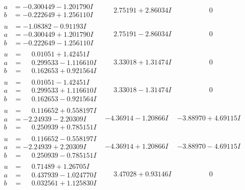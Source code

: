 \documentclass[1p]{elsarticle_modified}
\theoremstyle{definition}
\begin{document}
$$\begin{array}{c|c|c}
\begin{aligned}
a &= -0.300449 - 1.201790 I \\
b &= -0.222649 + 1.256110 I\end{aligned}
 & \phantom{-}2.75191 + 2.86034 I & \phantom{-0.000000 } 0 \\ \hline\begin{aligned}
u &= -1.08382 - 0.91193 I \\
a &= -0.300449 + 1.201790 I \\
b &= -0.222649 - 1.256110 I\end{aligned}
 & \phantom{-}2.75191 - 2.86034 I & \phantom{-0.000000 } 0 \\ \hline\begin{aligned}
u &= \phantom{-}0.01051 + 1.42451 I \\
a &= \phantom{-}0.299533 - 1.116610 I \\
b &= \phantom{-}0.162653 + 0.921564 I\end{aligned}
 & \phantom{-}3.33018 + 1.31474 I & \phantom{-0.000000 } 0 \\ \hline\begin{aligned}
u &= \phantom{-}0.01051 - 1.42451 I \\
a &= \phantom{-}0.299533 + 1.116610 I \\
b &= \phantom{-}0.162653 - 0.921564 I\end{aligned}
 & \phantom{-}3.33018 - 1.31474 I & \phantom{-0.000000 } 0 \\ \hline\begin{aligned}
u &= \phantom{-}0.116652 + 0.558197 I \\
a &= -2.24939 - 2.20309 I \\
b &= \phantom{-}0.250939 + 0.785151 I\end{aligned}
 & -4.36914 - 1.20866 I & -3.88970 + 4.69115 I \\ \hline\begin{aligned}
u &= \phantom{-}0.116652 - 0.558197 I \\
a &= -2.24939 + 2.20309 I \\
b &= \phantom{-}0.250939 - 0.785151 I\end{aligned}
 & -4.36914 + 1.20866 I & -3.88970 - 4.69115 I \\ \hline\begin{aligned}
u &= \phantom{-}0.71489 + 1.26705 I \\
a &= \phantom{-}0.437939 - 1.024770 I \\
b &= \phantom{-}0.032561 + 1.125830 I\end{aligned}
 & \phantom{-}3.47028 + 0.93146 I & \phantom{-0.000000 } 0 \\ \hline\begin{aligned}

\end{aligned}
\end{array}$$
\end{document}
